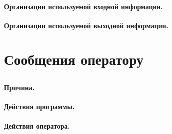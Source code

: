 \documentclass[allcolors=black]{article}
\begin{document}
\paragraph{Организации используемой входной информации.} 
\paragraph{Организации используемой выходной информации.} 

\section{Сообщения  оператору}
\subsection{}
\paragraph{Причина. } 
\paragraph{Действия программы. } 
\paragraph{Действия оператора. } 
\end{document}
